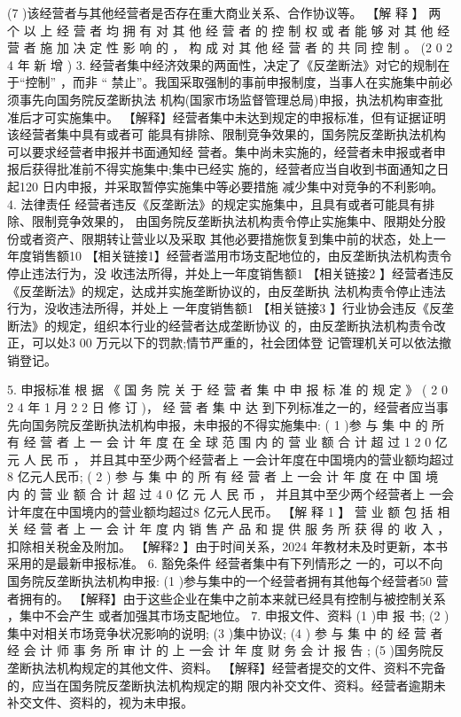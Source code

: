 \documentclass[UTF8,12pt]{ctexart}
\numberwithin{equation}{section} %
\numberwithin{figure}{section}
\numberwithin{table}{section}
\begin{document}
	
	(7 )该经营者与其他经营者是否存在重大商业关系、合作协议等。
	【解 释 】 两 个 以 上 经 营 者 均 拥 有 对 其 他 经 营 者 的 控 制 权 或 者 能 够 对 其 他 经 营 者 施 加 决 定 性 影 响 的 ， 构 成 对 其 他 经 营 者 的 共 同 控 制 。 (2 0 2 4 年 新 增 )
	3. 经营者集中经济效果的两面性，决定了《反垄断法》对它的规制在于“控制” ，而非 “ 禁止”。我国采取强制的事前申报制度，当事人在实施集中前必须事先向国务院反垄断执法 机构(国家市场监督管理总局)申报，执法机构审查批准后才可实施集中。
	【解释】经营者集中未达到规定的申报标准，但有证据证明该经营者集中具有或者可 能具有排除、限制竞争效果的，国务院反垄断执法机构可以要求经营者申报并书面通知经 营者。集中尚未实施的，经营者未申报或者申报后获得批准前不得实施集中;集中已经实 施的，经营者应当自收到书面通知之日起120 日内申报，并采取暂停实施集中等必要措施 减少集中对竞争的不利影响。
	4. 法律责任 经营者违反《反垄断法》的规定实施集中，且具有或者可能具有排除、限制竞争效果的， 由国务院反垄断执法机构责令停止实施集中、限期处分股份或者资产、限期转让营业以及采取 其他必要措施恢复到集中前的状态，处上一年度销售额10%
	【相关链接1】经营者滥用市场支配地位的，由反垄断执法机构责令停止违法行为，没 收违法所得，并处上一年度销售额1%
	【相关链接2 】经营者违反《反垄断法》的规定，达成并实施垄断协议的，由反垄断执 法机构责令停止违法行为，没收违法所得，并处上 一年度销售额1%
	【相关链接3 】行业协会违反《反垄断法》的规定，组织本行业的经营者达成垄断协议 的，由反垄断执法机构责令改正，可以处3 00 万元以下的罚款;情节严重的，社会团体登 记管理机关可以依法撤销登记。
	
	5. 申报标准
	根 据 《 国 务 院 关 于 经 营 者 集 中 申 报 标 准 的 规 定 》 ( 2 0 2 4 年 1 月 2 2 日 修 订 )， 经 营 者 集 中 达 到下列标准之一的，经营者应当事先向国务院反垄断执法机构申报，未申报的不得实施集中: ( 1 )参 与 集 中 的 所 有 经 营 者 上 一 会 计 年 度 在 全 球 范 围 内 的 营 业 额 合 计 超 过 1 2 0 亿 元 人 民 币 ， 并且其中至少两个经营者上 一会计年度在中国境内的营业额均超过8 亿元人民币;
	( 2 ) 参 与 集 中 的 所 有 经 营 者 上 一会 计 年 度 在 中 国 境 内 的 营 业 额 合 计 超 过 4 0 亿 元 人 民 币 ， 并且其中至少两个经营者上 一会计年度在中国境内的营业额均超过8 亿元人民币。
	【解 释 1 】 营 业 额 包 括 相 关 经 营 者 上 一 会 计 年 度 内 销 售 产 品 和 提 供 服 务 所 获 得 的 收 入 ， 扣除相关税金及附加。
	【解释2 】由于时间关系，2024 年教材未及时更新，本书采用的是最新申报标准。
	6. 豁免条件
	经营者集中有下列情形之 一的，可以不向国务院反垄断执法机构申报:
	(1 )参与集中的一个经营者拥有其他每个经营者50 %
	营者拥有的。
	【解释】由于这些企业在集中之前本来就已经具有控制与被控制关系 ，集中不会产生 或者加强其市场支配地位。
	7. 申报文件、资料
	(1 )申 报 书;
	(2 )集中对相关市场竞争状况影响的说明;
	(3 )集中协议;
	(4 ) 参 与 集 中 的 经 营 者 经 会 计 师 事 务 所 审 计 的 上 一会 计 年 度 财 务 会 计 报 告 ; (5 )国务院反垄断执法机构规定的其他文件、资料。
	【解释】经营者提交的文件、资料不完备的，应当在国务院反垄断执法机构规定的期 限内补交文件、资料。经营者逾期未补交文件、资料的，视为未申报。
	
\end{document}
